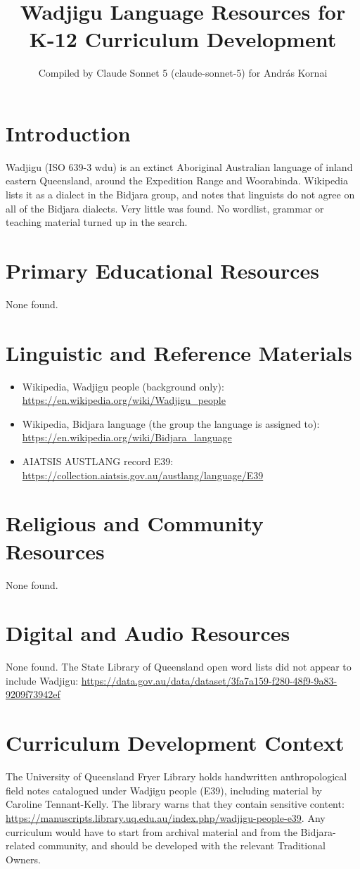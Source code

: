 \documentclass[12pt]{article}
\title{Wadjigu Language Resources for K-12 Curriculum Development}
\author{Compiled by Claude Sonnet 5 (claude-sonnet-5) for Andr\'as Kornai}
\date{}
\begin{document}
\maketitle

\section{Introduction}
Wadjigu (ISO 639-3 wdu) is an extinct Aboriginal Australian language of inland eastern Queensland, around the Expedition Range and Woorabinda. Wikipedia lists it as a dialect in the Bidjara group, and notes that linguists do not agree on all of the Bidjara dialects. Very little was found. No wordlist, grammar or teaching material turned up in the search.

\section{Primary Educational Resources}
None found.

\section{Linguistic and Reference Materials}
\begin{itemize}
\item Wikipedia, Wadjigu people (background only): \url{https://en.wikipedia.org/wiki/Wadjigu_people}
\item Wikipedia, Bidjara language (the group the language is assigned to): \url{https://en.wikipedia.org/wiki/Bidjara_language}
\item AIATSIS AUSTLANG record E39: \url{https://collection.aiatsis.gov.au/austlang/language/E39}
\end{itemize}

\section{Religious and Community Resources}
None found.

\section{Digital and Audio Resources}
None found. The State Library of Queensland open word lists did not appear to include Wadjigu: \url{https://data.gov.au/data/dataset/3fa7a159-f280-48f9-9a83-9209f73942ef}

\section{Curriculum Development Context}
The University of Queensland Fryer Library holds handwritten anthropological field notes catalogued under Wadjigu people (E39), including material by Caroline Tennant-Kelly. The library warns that they contain sensitive content: \url{https://manuscripts.library.uq.edu.au/index.php/wadjigu-people-e39}. Any curriculum would have to start from archival material and from the Bidjara-related community, and should be developed with the relevant Traditional Owners.
\end{document}
